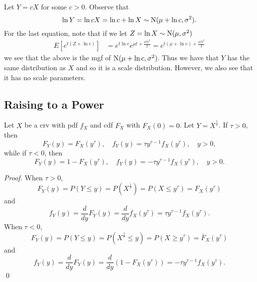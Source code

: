 \documentclass[notoc,notitlepage]{tufte-book}
\begin{document}
\begin{solution}
  Let $Y = cX$ for some $c > 0$. Observe that
  \begin{equation*}
    \ln Y = \ln cX = \ln c + \ln X \sim \operatorname{N}(\mu + \ln c, \sigma^2).
  \end{equation*}
  For the last equation, note that if we let $Z = \ln X \sim \operatorname{N}(\mu, \sigma^2)$
  \begin{align*}
    E\left[ e^{t( Z + \ln c )} \right] &= e^{t \ln c} e^{\mu t + \frac{\sigma^2 t^2}{2}} = e^{t ( \mu + \ln c ) + \frac{\sigma^2 t^2}{2}}
  \end{align*}
  we see that the above is the mgf of $\operatorname{N}(\mu + \ln c, \sigma^2)$. Thus we have that $Y$ has the same distribution as $X$ and so it is a scale distribution. However, we also see that it has no scale parameters.
\end{solution}


\subsection{Raising to a Power}%
\label{sub:raising_to_a_power}

\begin{propo}\label{propo:raising_to_a_power}
  Let $X$ be a crv with pdf $f_X$ and cdf $F_X$ with $F_X(0) = 0$. Let $Y = X^{\frac{1}{\tau}}$. If $\tau > 0$, then
  \begin{equation*}
    F_Y(y) = F_X(y^\tau), \quad f_Y(y) = \tau y^{\tau - 1} f_X(y^\tau), \quad y > 0,
  \end{equation*}
  while if $\tau < 0$, then
  \begin{equation*}
    F_Y(y) = 1 - F_X(y^\tau), \quad f_Y(y) = - \tau y^{\tau - 1} f_X(y^\tau), \quad y > 0.
  \end{equation*}
\end{propo}

\begin{proof}
  When $\tau > 0$,
  \begin{equation*}
    F_Y(y) = P(Y \leq y) = P\left(X^{\frac{1}{\tau}}\right) = P\left(X \leq y^\tau\right) = F_X\left(y^\tau\right)
  \end{equation*}
  and
  \begin{equation*}
    f_Y(y) = \frac{d}{dy} F_Y(y) = \frac{d}{dy}f_X\left(y^\tau\right) = \tau y^{\tau - 1} f_X(y^\tau).
  \end{equation*}
  When $\tau < 0$,
  \begin{equation*}
    F_Y(y) = P(Y \leq y) = P\left(X^{\frac{1}{\tau}} \leq y\right) = P\left( X \geq y^\tau \right) = \bar{F}_X(y^\tau)
  \end{equation*}
  and
  \begin{equation*}
    f_Y(y) = \frac{d}{dy} F_Y(y) = \frac{d}{dy} (1 - F_X\left(y^\tau\right)) = - \tau y^{\tau - 1} f_X\left(y^\tau\right).
  \end{equation*}\qed\
\end{proof}
\end{document}
